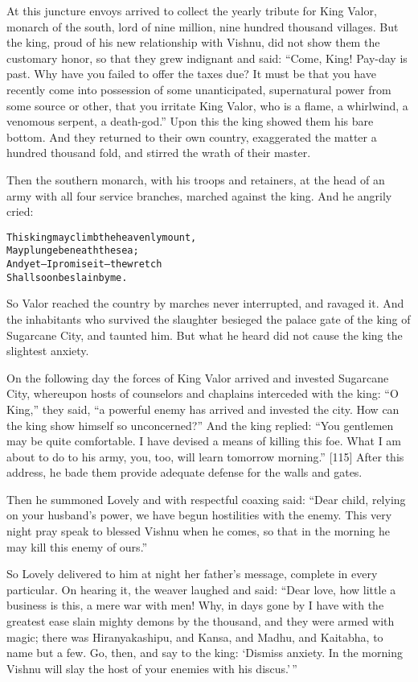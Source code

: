 \documentclass{article}
\renewenvironment{verbatim}{\begin{alltt}\normalfont\begin{centering}}{\end{centering}\end{alltt}}
\begin{document}
At this juncture envoys arrived to collect the yearly tribute for
King Valor, monarch of the south, lord of nine million, nine
hundred thousand villages. But the king, proud of his new
relationship with Vishnu, did not show them the customary honor, so
that they grew indignant and said:
``Come, King! Pay-day is past. Why have you failed to offer the taxes due? It must be that you have recently come into possession of some unanticipated, supernatural power from some source or other, that you irritate King Valor, who is a flame, a whirlwind, a venomous serpent, a death-god.''
Upon this the king showed them his bare bottom. And they returned
to their own country, exaggerated the matter a hundred thousand
fold, and stirred the wrath of their master.

Then the southern monarch, with his troops and retainers, at the
head of an army with all four service branches, marched against the
king. And he angrily cried:

\begin{verbatim}
This king may climb the heavenly mount,
    May plunge beneath the sea;
And yet--I promise it--the wretch
    Shall soon be slain by me.
\end{verbatim}
So Valor reached the country by marches never interrupted, and
ravaged it. And the inhabitants who survived the slaughter besieged
the palace gate of the king of Sugarcane City, and taunted him. But
what he heard did not cause the king the slightest anxiety.

On the following day the forces of King Valor arrived and invested
Sugarcane City, whereupon hosts of counselors and chaplains
interceded with the king: ``O King,'' they said,
``a powerful enemy has arrived and invested the city. How can the king show himself so unconcerned?''
And the king replied:
``You gentlemen may be quite comfortable. I have devised a means of killing this foe. What I am about to do to his army, you, too, will learn tomorrow morning.''
[115] After this address, he bade them provide adequate defense for
the walls and gates.

Then he summoned Lovely and with respectful coaxing said:
``Dear child, relying on your husband's power, we have begun hostilities with the enemy. This very night pray speak to blessed Vishnu when he comes, so that in the morning he may kill this enemy of ours.''

So Lovely delivered to him at night her father's message, complete
in every particular. On hearing it, the weaver laughed and said:
``Dear love, how little a business is this, a mere war with men! Why, in days gone by I have with the greatest ease slain mighty demons by the thousand, and they were armed with magic; there was Hiranyakashipu, and Kansa, and Madhu, and Kaitabha, to name but a few. Go, then, and say to the king: `Dismiss anxiety. In the morning Vishnu will slay the host of your enemies with his discus.'\,''
\end{document}
